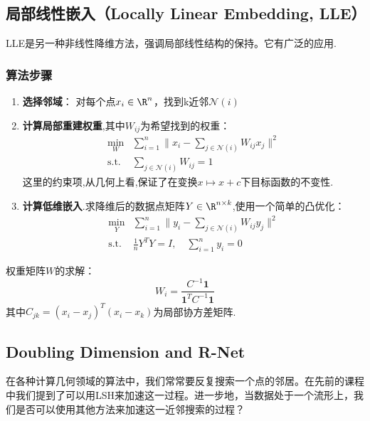 \documentclass[lang=cn,newtx,10pt,scheme=chinese,chinesefont=nofont,citestyle=gb7714-2015, bibstyle=gb7714-2015]{elegantbook}
\begin{document}
\begin{refsection}
\subsection{局部线性嵌入（Locally Linear Embedding, LLE）}

LLE是另一种非线性降维方法，强调局部线性结构的保持。它有广泛的应用\cite{roweis2000nonlinear}.

\subsubsection{算法步骤}

\begin{enumerate}
\item \textbf{选择邻域}：
   对每个点$x_i\in\R^n$，找到k近邻$\mathcal{N}(i)$

\item \textbf{计算局部重建权重},其中$W_{ij}$为希望找到的权重：
   \begin{align*}
   \min_W & \sum_{i=1}^n \|x_i - \sum_{j \in \mathcal{N}(i)} W_{ij}x_j\|^2 \\
   \text{s.t.} & \sum_{j \in \mathcal{N}(i)} W_{ij} = 1
   \end{align*}
这里的约束项,从几何上看,保证了在变换$x\mapsto x+c$下目标函数的不变性.

\item \textbf{计算低维嵌入}.求降维后的数据点矩阵$Y\in\R^{n\times k}$,使用一个简单的凸优化：
   \begin{align*}
   \min_Y & \sum_{i=1}^n \|y_i - \sum_{j \in \mathcal{N}(i)} W_{ij}y_j\|^2 \\
   \text{s.t.} & \frac{1}{n}Y^TY = I, \quad \sum_{i=1}^n y_i = 0
   \end{align*}
\end{enumerate}

\begin{remark}
    权重矩阵$W$的求解：
$$
W_i = \frac{C^{-1}\mathbf{1}}{\mathbf{1}^T C^{-1}\mathbf{1}}
$$
其中$C_{jk} = (x_i - x_j)^T(x_i - x_k)$为局部协方差矩阵.
\end{remark}

\subsection{Doubling Dimension and R-Net}

在各种计算几何领域的算法中，我们常常要反复搜索一个点的邻居。在先前的课程中我们提到了可以用LSH来加速这一过程。进一步地，当数据处于一个流形上，我们是否可以使用其他方法来加速这一近邻搜索的过程？


\end{refsection}
\end{document}
